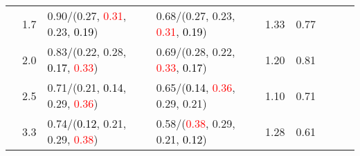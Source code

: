 \documentclass[10pt,a4paper]{report}
\begin{document}
\begin{table}[!htbp]
\begin{center}
{\begin{tabular}{ccllccccc}
				  & 1.7                               & 0.90/(0.27, \textcolor{red}{0.31}, 0.23, \textcolor{black}{0.19})                                 & 0.68/(0.27, 0.23, \textcolor{red}{0.31}, \textcolor{black}{0.19})                                 & 1.33             & 0.77                     \\
				  & 2.0                               & 0.83/(0.22, 0.28, \textcolor{black}{0.17}, \textcolor{red}{0.33})                                 & 0.69/(0.28, 0.22, \textcolor{red}{0.33}, \textcolor{black}{0.17})                                 & 1.20             & 0.81                     \\
				  & 2.5                               & 0.71/(0.21, \textcolor{black}{0.14}, 0.29, \textcolor{red}{0.36})                                 & 0.65/(\textcolor{black}{0.14}, \textcolor{red}{0.36}, 0.29, 0.21)                                 & 1.10             & 0.71                     \\
				  & 3.3                               & 0.74/(\textcolor{black}{0.12}, 0.21, 0.29, \textcolor{red}{0.38})                                 & 0.58/(\textcolor{red}{0.38}, 0.29, 0.21, \textcolor{black}{0.12})                                 & 1.28             & 0.61                     \\
				\bottomrule
			\end{tabular}}
	\end{center}
\end{table}
\end{document}
